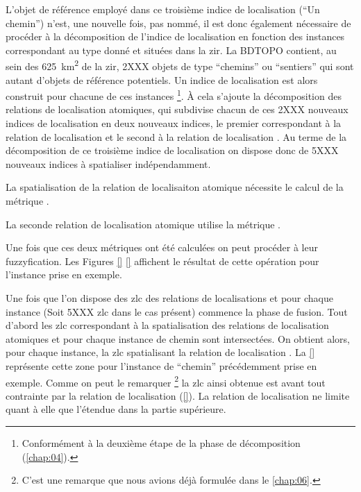 L'objet de référence employé dans ce troisième indice de localisation
(\enquote{Un chemin}) n'est, une nouvelle fois, pas nommé, il est donc
également nécessaire de procéder à la décomposition de l'indice de
localisation en fonction des instances correspondant au type donné et
situées dans la \ac{zir}. La BDTOPO contient, au sein des
\SI{625}{\kilo\meter\squared} de la \ac{zir}, 2XXX objets de type
\enquote{chemins} ou \enquote{sentiers} qui sont autant d'objets de
référence potentiels. Un indice de localisation est alors construit
pour chacune de ces instances \footnote{Conformément à la deuxième
  étape de la phase de décomposition (\autoref{chap:04}).}. À cela
s'ajoute la décomposition des relations de localisation atomiques, qui
subdivise chacun de ces 2XXX nouveaux indices de localisation en deux
nouveaux indices, le premier correspondant à la relation de
localisation  et le second à la relation de
localisation . Au terme de la décomposition de ce
troisième indice de localisation on dispose donc de 5XXX nouveaux
indices à spatialiser indépendamment.

La spatialisation de la relation de localisaiton atomique
 nécessite le calcul de la métrique
.

La seconde relation de localisation atomique utilise la métrique
.

Une fois que ces deux métriques ont été calculées on peut procéder à
leur fuzzyfication. Les Figures \ref{} \ref{} affichent le résultat de
cette opération pour l'instance prise en exemple.

Une fois que l'on dispose des \ac{zlc} des relations de localisations
 et  pour
chaque instance (Soit 5XXX \ac{zlc} dans le cas présent) commence la
phase de fusion. Tout d'abord les \ac{zlc} correspondant à la
spatialisation des relations de localisation atomiques
 et  pour
chaque instance de chemin sont intersectées. On obtient alors, pour
chaque instance, la \ac{zlc} spatialisant la relation de localisation
. La \autoref{} représente cette zone pour
l'instance de \enquote{chemin} précédemment prise en exemple. Comme on
peut le remarquer \footnote{C'est une remarque que nous avions déjà
  formulée dans le \autoref{chap:06}.} la \ac{zlc} ainsi obtenue est
avant tout contrainte par la relation de localisation
 (\autoref{}). La relation de localisation
 ne limite quant à elle que l'étendue dans
la partie supérieure.

